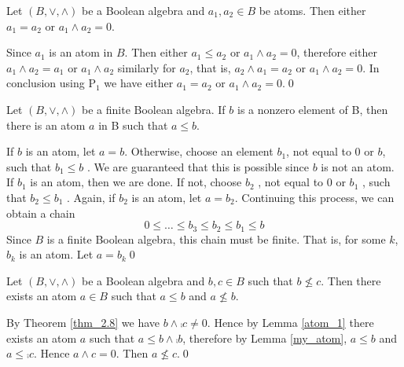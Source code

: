 \begin{lemma}
    Let \((B,\vee,\wedge)\) be a Boolean algebra and \(a_1,a_2\in B\) be atoms. Then either \(a_1=a_2\) or \(a_1\wedge a_2=0\).
\end{lemma}

\begin{myproof}
    Since \(a_1\) is an atom in \(B\). Then either \(a_1\leq a_2\) or \(a_1\wedge a_2=0\), therefore either \(a_1\wedge a_2=a_1\) or \(a_1\wedge a_2\) similarly for \(a_2\), that is, \(a_2\wedge a_1=a_2\) or \(a_1\wedge a_2=0\). In conclusion using \(\mathrm{P_1}\) we have either \(a_1=a_2\) or \(a_1\wedge a_2=0\).\qed
\end{myproof}


\begin{lemma}
\label{atom_1}
    Let \((B,\vee,\wedge)\) be a finite Boolean algebra. If \(b\) is a nonzero element of B, then there is an atom \(a\) in B such that \(a\leq b\).
\end{lemma}

\begin{myproof}
    If \(b\) is an atom, let \(a=b\). Otherwise, choose an element \(b_1\), not equal to \(0\) or \(b\), such that \(b_1\leq b\) . We are guaranteed that this is possible since \(b\) is not an atom. If \(b_1\) is an atom, then we are done. If not, choose \(b_2\) , not equal to \(0\) or \(b_1\) , such that \(b_2\leq b_1\) . Again, if \(b_2\) is an atom, let \(a=b_2\). Continuing this process, we can obtain a chain
    \[
    0\leq\dots\leq b_3\leq b_2\leq b_1\leq b
    \]
    Since \(B\) is a finite Boolean algebra, this chain must be finite. That is, for some \(k\), \(b_k\) is an atom. Let \(a=b_k\)\qed
\end{myproof}

\begin{lemma}
\label{atom_2}
    Let \((B,\vee,\wedge)\) be a Boolean algebra and \(b,c\in B\) such that \(b\nleq c\). Then there exists an atom \(a\in B\) such that \(a\leq b\) and \(a\nleq b\).
\end{lemma}

\begin{myproof}
    By Theorem \ref{thm_2.8} we have \(b\wedge\comp{c}\neq0\). Hence by Lemma \ref{atom_1} there exists an atom \(a\) such that \(a\leq b\wedge\comp{b}\), therefore by Lemma \ref{my_atom}, \(a\leq b\) and \(a\leq\comp{c}\). Hence \(a\wedge c=0\). Then \(a\nleq c\).\qed
\end{myproof}

